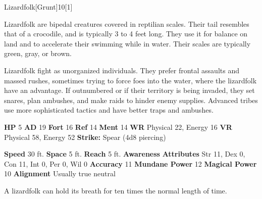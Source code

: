   \begin{monsection}{Lizardfolk}[Grunt]{10}[1]
    \vspace{-1em}\vspace{-1em}
    \vspace{0em}

    
    Lizardfolk are bipedal creatures covered in reptilian scales.
    Their tail resembles that of a crocodile, and is typically 3 to 4 feet long.
    They use it for balance on land and to accelerate their swimming while in water.
    Their scales are typically green, gray, or brown.

    Lizardfolk fight as unorganized individuals.
    They prefer frontal assaults and massed rushes, sometimes trying to force foes into the water, where the lizardfolk have an advantage.
    If outnumbered or if their territory is being invaded, they set snares, plan ambushes, and make raids to hinder enemy supplies.
    Advanced tribes use more sophisticated tactics and have better traps and ambushes.
  
    

    \begin{spellcontent}
      \begin{spelltargetinginfo}
        \pari \textbf{HP} 5 \monsep
          \textbf{AD} 19 \monsep
          \textbf{Fort} 16 \monsep
          \textbf{Ref} 14 \monsep
          \textbf{Ment} 14
        \pari \textbf{WR} Physical 22, Energy 16 \monsep
        \textbf{VR} Physical 58, Energy 52
        \pari \textbf{Strike:}
            Spear  (4d8 piercing)
      \end{spelltargetinginfo}
    \end{spellcontent}
    \begin{monsterfooter}
      \pari \textbf{Speed} 30 ft. \monsep
        \textbf{Space} 5 ft. \monsep
        \textbf{Reach} 5 ft.
      \pari \textbf{Awareness} 
      \pari \textbf{Attributes}
        Str 11, Dex 0,
        Con 11, Int 0,
        Per 0, Wil 0
      \pari \textbf{Accuracy} 11 \monsep
        \textbf{Mundane Power} 12 \monsep
      \textbf{Magical Power} 10
      \pari \textbf{Alignment} Usually true neutral
    \end{monsterfooter}
  \end{monsection}
   A lizardfolk can hold its breath for ten times the normal length of time.
  
